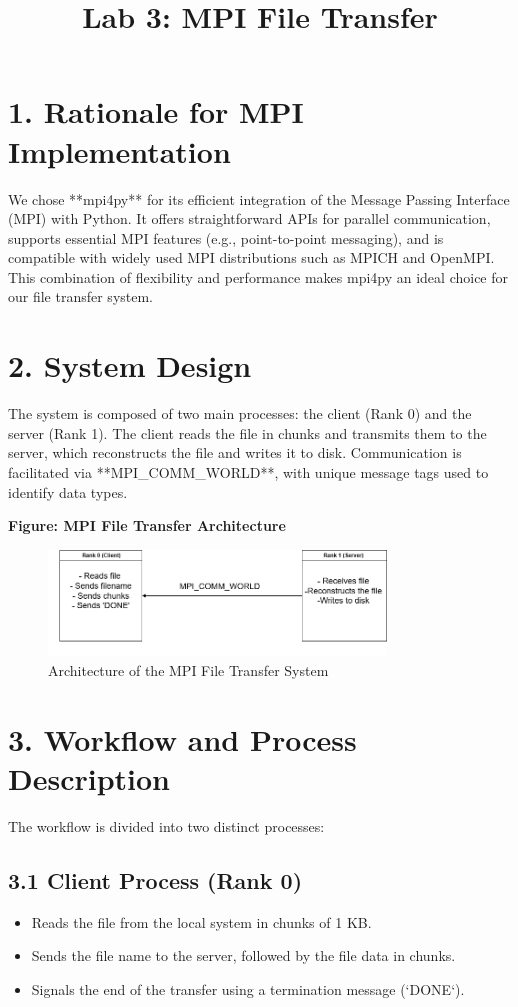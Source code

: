 \documentclass[a4paper,12pt]{article}
\title{Lab 3: MPI File Transfer}
\author{}
\date{}
\begin{document}
\maketitle

\section*{1. Rationale for MPI Implementation}
We chose **mpi4py** for its efficient integration of the Message Passing Interface (MPI) with Python. It offers straightforward APIs for parallel communication, supports essential MPI features (e.g., point-to-point messaging), and is compatible with widely used MPI distributions such as MPICH and OpenMPI. This combination of flexibility and performance makes mpi4py an ideal choice for our file transfer system.

\section*{2. System Design}
The system is composed of two main processes: the client (Rank 0) and the server (Rank 1). The client reads the file in chunks and transmits them to the server, which reconstructs the file and writes it to disk. Communication is facilitated via **MPI\_COMM\_WORLD**, with unique message tags used to identify data types.

\noindent \textbf{Figure: MPI File Transfer Architecture}
\begin{figure}[h!]
    \centering
    \includegraphics[width=0.8\textwidth]{design.png} %
    \caption{Architecture of the MPI File Transfer System}
\end{figure}

\section*{3. Workflow and Process Description}
The workflow is divided into two distinct processes:

\subsection*{3.1 Client Process (Rank 0)}
\begin{itemize}
    \item Reads the file from the local system in chunks of 1 KB.
    \item Sends the file name to the server, followed by the file data in chunks.
    \item Signals the end of the transfer using a termination message (`DONE`).
\end{itemize}
\end{document}
